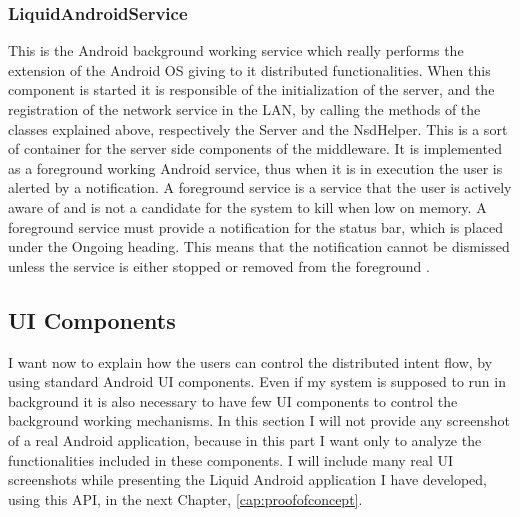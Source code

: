 \subsubsection{LiquidAndroidService}
This is the Android background working service which really performs the extension of the Android OS giving to it distributed functionalities. When this component is started it is responsible of the initialization of the server, and the registration of the network service in the LAN, by calling the methods of the classes explained above, respectively the Server and the NsdHelper. This is a sort of container for the server side components of the middleware. It is implemented as a foreground working Android service, thus when it is in execution the user is alerted by a notification. A foreground service is a service that the user is actively aware of and is not a candidate for the system to kill when low on memory. A foreground service must provide a notification for the status bar, which is placed under the Ongoing heading. This means that the notification cannot be dismissed unless the service is either stopped or removed from the foreground \cite{devandroidrunning}.
\subsection{UI Components}
I want now to explain how the users can control the distributed intent flow, by using standard Android UI components. Even if my system is supposed to run in background it is also necessary to have few UI components to control the background working mechanisms. In this section I will not provide any screenshot of a real Android application, because in this part I want only to analyze the functionalities included in these components. I will include many real UI screenshots while presenting the Liquid Android application I have developed, using this API, in the next Chapter, \ref{cap:proofofconcept}.
